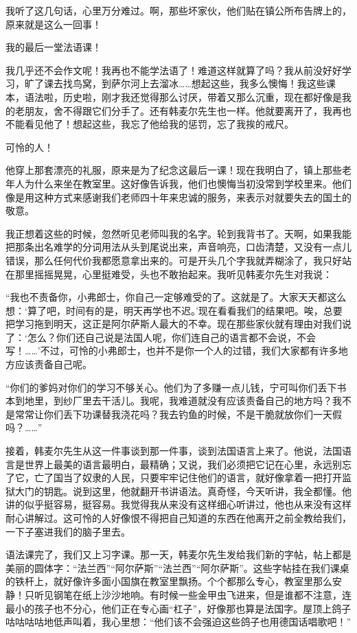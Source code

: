 \documentclass[12pt,UTF-8,openany]{ctexbook}
\begin{document}
\begin{normalsize}
    我听了这几句话，心里万分难过。啊，那些坏家伙，他们贴在镇公所布告牌上的，原来就是这么一回事！
    
    我的最后一堂法语课！
    
    我几乎还不会作文呢！我再也不能学法语了！难道这样就算了吗？我从前没好好学习，旷了课去找鸟窝，到萨尔河上去溜冰……想起这些，我多么懊悔！我这些课本，语法啦，历史啦，刚才我还觉得那么讨厌，带着又那么沉重，现在都好像是我的老朋友，舍不得跟它们分手了。还有韩麦尔先生也一样。他就要离开了，我再也不能看见他了！想起这些，我忘了他给我的惩罚，忘了我挨的戒尺。
    
    可怜的人！
    
    他穿上那套漂亮的礼服，原来是为了纪念这最后一课！现在我明白了，镇上那些老年人为什么来坐在教室里。这好像告诉我，他们也懊悔当初没常到学校里来。他们像是用这种方式来感谢我们老师四十年来忠诚的服务，来表示对就要失去的国土的敬意。
    
    我正想着这些的时候，忽然听见老师叫我的名字。轮到我背书了。天啊，如果我能把那条出名难学的分词用法从头到尾说出来，声音响亮，口齿清楚，又没有一点儿错误，那么任何代价我都愿意拿出来的。可是开头几个字我就弄糊涂了，我只好站在那里摇摇晃晃，心里挺难受，头也不敢抬起来。我听见韩麦尔先生对我说：
    
    “我也不责备你，小弗郎士，你自己一定够难受的了。这就是了。大家天天都这么想：‘算了吧，时间有的是，明天再学也不迟。’现在看看我们的结果吧。唉，总要把学习拖到明天，这正是阿尔萨斯人最大的不幸。现在那些家伙就有理由对我们说了：‘怎么？你们还自己说是法国人呢，你们连自己的语言都不会说，不会写！……’不过，可怜的小弗郎士，也并不是你一个人的过错，我们大家都有许多地方应该责备自己呢。
    
    “你们的爹妈对你们的学习不够关心。他们为了多赚一点儿钱，宁可叫你们丢下书本到地里，到纱厂里去干活儿。我呢，我难道就没有应该责备自己的地方吗？我不是常常让你们丢下功课替我浇花吗？我去钓鱼的时候，不是干脆就放你们一天假吗？……”
    
    接着，韩麦尔先生从这一件事谈到那一件事，谈到法国语言上来了。他说，法国语言是世界上最美的语言最明白，最精确；又说，我们必须把它记在心里，永远别忘了它，亡了国当了奴隶的人民，只要牢牢记住他们的语言，就好像拿着一把打开监狱大门的钥匙。说到这里，他就翻开书讲语法。真奇怪，今天听讲，我全都懂。他讲的似乎挺容易，挺容易。我觉得我从来没有这样细心听讲过，他也从来没有这样耐心讲解过。这可怜的人好像恨不得把自己知道的东西在他离开之前全教给我们，一下子塞进我们的脑子里去。
    
    语法课完了，我们又上习字课。那一天，韩麦尔先生发给我们新的字帖，帖上都是美丽的圆体字：“法兰西”“阿尔萨斯”“法兰西”“阿尔萨斯”。这些字帖挂在我们课桌的铁杆上，就好像许多面小国旗在教室里飘扬。个个都那么专心，教室里那么安静！只听见钢笔在纸上沙沙地响。有时候一些金甲虫飞进来，但是谁都不注意，连最小的孩子也不分心，他们正在专心画“杠子”，好像那也算是法国字。屋顶上鸽子咕咕咕咕地低声叫着，我心里想：“他们该不会强迫这些鸽子也用德国话唱歌吧！”
    

\end{normalsize}
\end{document}
